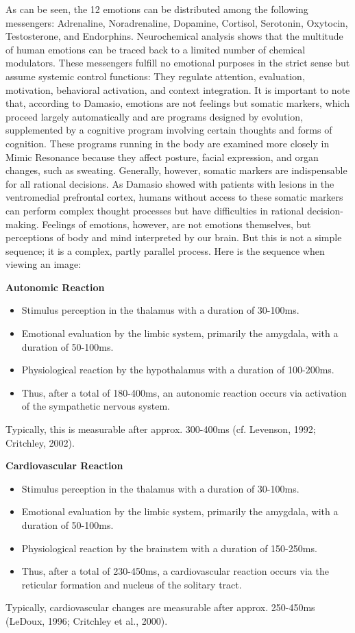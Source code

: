 As can be seen, the 12 emotions can be distributed among the following messengers: Adrenaline, Noradrenaline, Dopamine, Cortisol, Serotonin, Oxytocin, Testosterone, and Endorphins.
Neurochemical analysis shows that the multitude of human emotions can be traced back to a limited number of chemical modulators.
These messengers fulfill no emotional purposes in the strict sense but assume systemic control functions: They regulate attention, evaluation, motivation, behavioral activation, and context integration.
It is important to note that, according to Damasio, emotions are not feelings but somatic markers, which proceed largely automatically and are programs designed by evolution, supplemented by a cognitive program involving certain thoughts and forms of cognition.
These programs running in the body are examined more closely in Mimic Resonance because they affect posture, facial expression, and organ changes, such as sweating.
Generally, however, somatic markers are indispensable for all rational decisions.
As Damasio showed with patients with lesions in the ventromedial prefrontal cortex, humans without access to these somatic markers can perform complex thought processes but have difficulties in rational decision-making.
Feelings of emotions, however, are not emotions themselves, but perceptions of body and mind interpreted by our brain.
But this is not a simple sequence; it is a complex, partly parallel process.
Here is the sequence when viewing an image:

\textbf{Autonomic Reaction}
\begin{itemize}
    \item Stimulus perception in the thalamus with a duration of 30-100ms.
    \item Emotional evaluation by the limbic system, primarily the amygdala, with a duration of 50-100ms.
    \item Physiological reaction by the hypothalamus with a duration of 100-200ms.
    \item Thus, after a total of 180-400ms, an autonomic reaction occurs via activation of the sympathetic nervous system.
\end{itemize}
Typically, this is measurable after approx. 300-400ms (cf. Levenson, 1992; Critchley, 2002).

\textbf{Cardiovascular Reaction}
\begin{itemize}
    \item Stimulus perception in the thalamus with a duration of 30-100ms.
    \item Emotional evaluation by the limbic system, primarily the amygdala, with a duration of 50-100ms.
    \item Physiological reaction by the brainstem with a duration of 150-250ms.
    \item Thus, after a total of 230-450ms, a cardiovascular reaction occurs via the reticular formation and nucleus of the solitary tract.
\end{itemize}
Typically, cardiovascular changes are measurable after approx. 250-450ms (LeDoux, 1996; Critchley et al., 2000).

